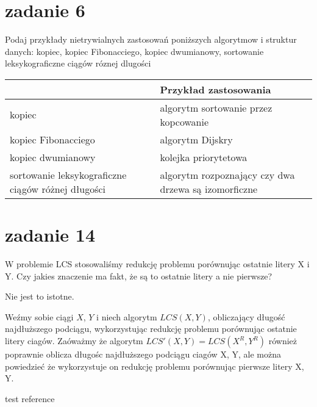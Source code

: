 \documentclass[svgnames]{report}
\begin{document}

\section{zadanie 6}
\begin{framed}
Podaj przykłady nietrywialnych zastosowań poniższych algorytmow i struktur danych:
kopiec, kopiec Fibonacciego, kopiec dwumianowy, sortowanie leksykograficzne ciągów róznej dlugości
\end{framed}

\begin{tabular}{l|l}
					&	Przykład zastosowania	\\	\hline
kopiec 				&	algorytm sortowanie przez kopcowanie	\\	\hline
kopiec Fibonacciego &	algorytm Dijskry	\\	\hline
kopiec dwumianowy 	&	kolejka priorytetowa	\\	\hline
sortowanie leksykograficzne ciągów różnej długości & algorytm rozpoznający czy dwa drzewa są izomorficzne	\\	\hline
\end{tabular}


\section{zadanie 14}
\begin{framed}
W problemie LCS stosowaliśmy redukcję problemu porównując ostatnie litery X i Y. Czy jakies znaczenie ma fakt, że są to ostatnie litery a nie pierwsze?
\end{framed}
Nie jest to istotne.

Weźmy sobie ciągi $X$, $Y$ i niech algorytm $LCS(X, Y)$, obliczający długość najdłuższego podciągu, wykorzystując redukcję problemu porównując ostatnie litery ciagów.
Zaóważmy że algorytm $LCS'(X, Y) = LCS(X^R, Y^R)$ również poprawnie oblicza długośc najdłuższego podciągu ciagów X, Y, ale można powiedzieć że wykorzystuje on redukcję problemu porównując pierwsze litery X, Y.



\begin{thebibliography}{99}
 test reference
\end{thebibliography}
\end{document}
